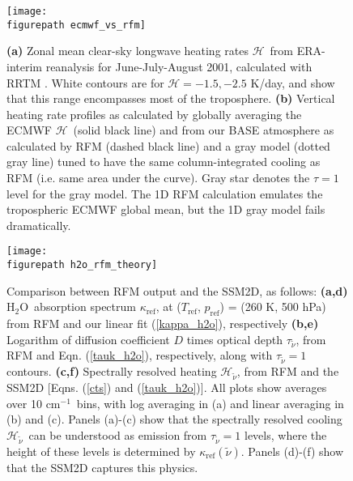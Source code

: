 \documentclass{ametsoc}
\newcommand{\eqnref}[1]{(\ref{#1})}
\newcommand{\cminverse}{\ensuremath{\mathrm{cm^{-1}}}}
\newcommand{\htwo}{\ensuremath{\mathrm{H_2O}}}
\newcommand{\wv}{\ensuremath{\widetilde{\nu}}}
\newcommand{\ch}{\ensuremath{\mathcal{H}}}
\newcommand{\chk}{\ensuremath{\ch_{\wv}}}
\newcommand{\tauk}{\ensuremath{\tau_{\wv}}}
\newcommand{\kapparef}{\ensuremath{\kappa_{\mathrm{ref}}}}
\newcommand{\Tref}{\ensuremath{T_{\mathrm{ref}}}}
\newcommand{\pref}{\ensuremath{p_{\mathrm{ref}}}}
\newcommand{\figurepath}{./}
\begin{document}
%
\begin{figure}[h]
	\begin{center}
			\texttt{[image: \\figurepath ecmwf\_vs\_rfm]}
			\caption{\textbf{(a)}  Zonal mean clear-sky longwave heating rates \ch\ from ERA-interim reanalysis \citep{dee2011} for June-July-August 2001, calculated with RRTM  \citep{morcrette1998,mlawer1997}. White contours are for $\ch= -1.5, -2.5 $ K/day, and show that this range encompasses  most of the troposphere.
						\textbf{(b)} Vertical heating rate profiles as calculated by globally averaging the ECMWF \ch\ (solid black line) and from our BASE atmosphere as calculated by RFM (dashed black line)  and a gray model (dotted gray line) tuned to have the same column-integrated cooling as RFM (i.e. same area under the curve). Gray star denotes the $\tau=1$ level for the gray model. The 1D RFM calculation emulates the tropospheric ECMWF global mean, but the 1D gray model fails dramatically.
			\label{ecmwf_vs_rfm}
			}
	 \end{center}
\end{figure}

\begin{figure}[h]
	\begin{center}
			\texttt{[image: \\figurepath h2o\_rfm\_theory]}
		\caption{Comparison between RFM output and the SSM2D, as follows:
					 \textbf{(a,d)} \htwo\ absorption spectrum \kapparef, at (\Tref, \pref) = (260 K, 500 hPa) from RFM and our linear fit \eqnref{kappa_h2o}, respectively
					 \textbf{(b,e)} Logarithm of diffusion coefficient $D$ times optical depth $\tauk$, from RFM and Eqn. \eqnref{tauk_h2o}, respectively, along with $\tauk=1$ contours.
					 \textbf{(c,f)}  Spectrally resolved heating $\chk$, from RFM and  the SSM2D [Eqns. \eqnref{cts} and \eqnref{tauk_h2o}]. 
					 All plots show averages over 10 \cminverse\ bins, with log averaging in (a) and linear averaging in (b) and (c). Panels (a)-(c) show that the spectrally resolved cooling \chk\ can be understood as emission from $\tauk=1$ levels, where the height of these levels is determined by $\kapparef(\wv)$. Panels (d)-(f) show that  the SSM2D  captures this physics.
		\label{h2o_rfm_theory}
		}
	\end{center}
\end{figure}
\end{document}
